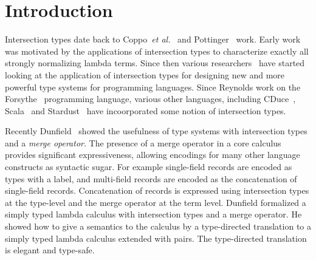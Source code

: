 \section{Introduction}
\label{sec:intro}

Intersection types date back to Coppo~\textit{et
  al.}~\cite{coppo1981functional} and Pottinger~\cite{Pottinger80type}
work. Early work was motivated by the applications of
intersection types to characterize exactly all strongly normalizing
lambda terms.
Since then various researchers~\cite{Freeman91refinement,pierce1991programming1,Castagna92calculus,pierce1997intersection,davies2000intersection,Dunfield03Intersections} have started looking at the application
of intersection types for designing new and more powerful type systems 
for programming languages. Since Reynolds work on the Forsythe~\cite{reynolds1997design}
programming language, various other languages, including
CDuce~\cite{Benzaken03cduce}, Scala~\cite{scala-overview} and 
Stardust~\cite{Dunfield07:Stardust} have incoorporated some notion 
of intersection types.

Recently Dunfield~\cite{dunfield2014elaborating} showed the
usefulness of type systems with intersection types and a \emph{merge operator}. The presence of a merge
operator in a core calculus provides significant expressiveness, allowing
encodings for many other language constructs as syntactic sugar. For example
single-field records are encoded as types with a label, and multi-field
records are encoded as the concatenation of single-field records. Concatenation
of records is expressed using intersection types at the type-level and the
merge operator at the term level. Dunfield formalized a simply
typed lambda calculus with intersection types and a merge operator. He showed
how to give a semantics to the calculus by a type-directed translation to a
simply typed lambda calculus extended with pairs. The type-directed translation
is elegant and type-safe.

